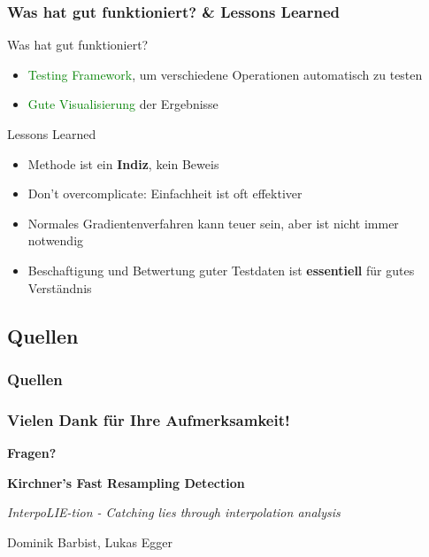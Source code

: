 \documentclass[11pt,t,usepdftitle=false,aspectratio=169]{beamer}
\begin{document}
\begin{frame}
	\frametitle{Was hat gut funktioniert? \& Lessons Learned}
	\begin{exampleblock}{Was hat gut funktioniert?}
		\begin{itemize}
			\item \textcolor{green}{Testing Framework}, um verschiedene Operationen automatisch zu testen
			\item \textcolor{green}{Gute Visualisierung} der Ergebnisse
		\end{itemize}
	\end{exampleblock}
    \begin{block}{Lessons Learned}
        \begin{itemize}
            \item Methode ist ein \textbf{Indiz}, kein Beweis
            \item Don't overcomplicate: Einfachheit ist oft effektiver
            \item Normales Gradientenverfahren kann teuer sein, aber ist nicht immer notwendig
            \item Beschaftigung und Betwertung guter Testdaten ist \textbf{essentiell} für gutes Verständnis
        \end{itemize}
    \end{block}
\end{frame}

\subsection{Quellen}
\begin{frame}
    \frametitle{Quellen}
    \begingroup
    \setlength{\bibitemsep}{2pt}
    \setlength{\itemsep}{0pt}
    \setlength{\parskip}{0pt}
    \renewcommand{\bibfont}{\tiny}
    \printbibliography[heading=none]
    \endgroup
\end{frame}

\begin{frame}
	\frametitle{Vielen Dank für Ihre Aufmerksamkeit!}
	
	\vspace{2em}
	
	\begin{center}
		\Large{\textbf{Fragen?}}
		
		\vspace{1.5em}
		
		\textbf{Kirchner's Fast Resampling Detection}
		
		\textit{InterpoLIE-tion - Catching lies through interpolation analysis}
		
		\vspace{1.5em}
		
		\small{Dominik Barbist, Lukas Egger}
	\end{center}
\end{frame}
\end{document}
